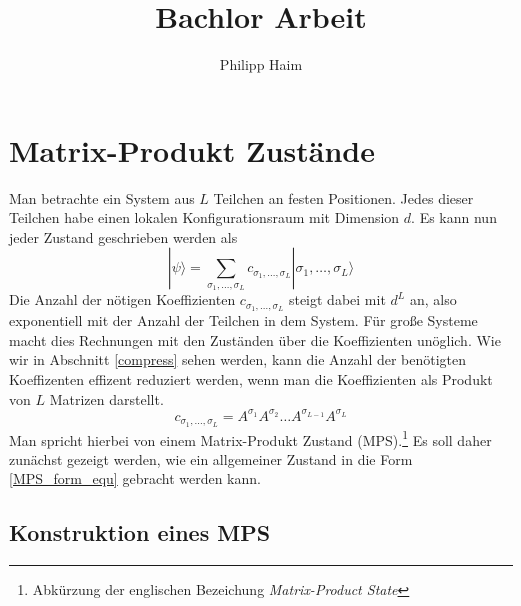 \documentclass[10pt,a4paper]{report}
\author{Philipp Haim}
\title{Bachlor Arbeit}
\newcommand{\SumIndex}{\sigma_1,\ldots,\sigma_L}
\begin{document}
\maketitle
\begin{abstract}

\end{abstract}
\tableofcontents

\chapter{Matrix-Produkt Zustände}\label{MPS_chapter}


Man betrachte ein System aus $L$ Teilchen an festen Positionen. Jedes dieser Teilchen habe einen lokalen Konfigurationsraum mit Dimension $d$. Es kann nun jeder Zustand geschrieben werden als 
\begin{equation}\label{psi_equ}
|\psi\rangle=\sum_{\SumIndex} c_{\SumIndex}|\SumIndex\rangle
\end{equation}
Die Anzahl der nötigen Koeffizienten $c_{\sigma_1,\ldots,\sigma_L}$ steigt dabei mit $d^L$ an, also exponentiell mit der Anzahl der Teilchen in dem System. Für große Systeme macht dies Rechnungen mit den Zuständen über die Koeffizienten unöglich. Wie wir in Abschnitt \ref{compress} sehen werden, kann die Anzahl der benötigten Koeffizenten effizent reduziert werden, wenn man die Koeffizienten als Produkt von $L$ Matrizen darstellt.\cite{MPS-main}
\begin{equation}\label{MPS_form_equ}
c_{\SumIndex}=A^{\sigma_1}A^{\sigma_2}\ldots A^{\sigma_{L-1}}A^{\sigma_L}
\end{equation}
Man spricht hierbei von einem Matrix-Produkt Zustand (MPS).\footnote{Abkürzung der englischen Bezeichung \textit{Matrix-Product State}}
Es soll daher zunächst gezeigt werden, wie ein allgemeiner Zustand in die Form \ref{MPS_form_equ} gebracht werden kann.
\section{Konstruktion eines MPS}\label{construction}
\end{document}
